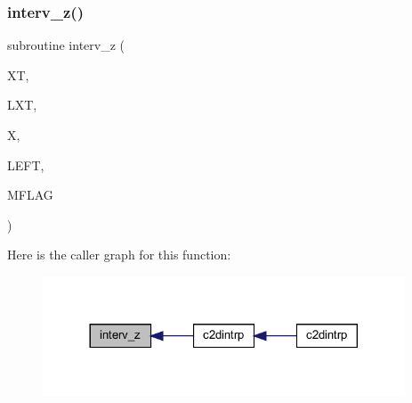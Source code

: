 \subsubsection{\texorpdfstring{interv\+\_\+z()}{interv\_z()}}
{\footnotesize\ttfamily subroutine interv\+\_\+z (\begin{DoxyParamCaption}\item[{real, dimension(lxt)}]{XT,  }\item[{integer}]{L\+XT,  }\item[{real}]{X,  }\item[{integer}]{L\+E\+FT,  }\item[{integer}]{M\+F\+L\+AG }\end{DoxyParamCaption})}

Here is the caller graph for this function\+:\nopagebreak
\begin{figure}[H]
\begin{center}
\leavevmode
\includegraphics[width=305pt]{Leroi_8f90_a94be7a783132491a0e0694c462d979b5_icgraph}
\end{center}
\end{figure}
\mbox{\label{Leroi_8f90_ad3c98b0aa8032dd5e2c3fce9417d4512}} 
